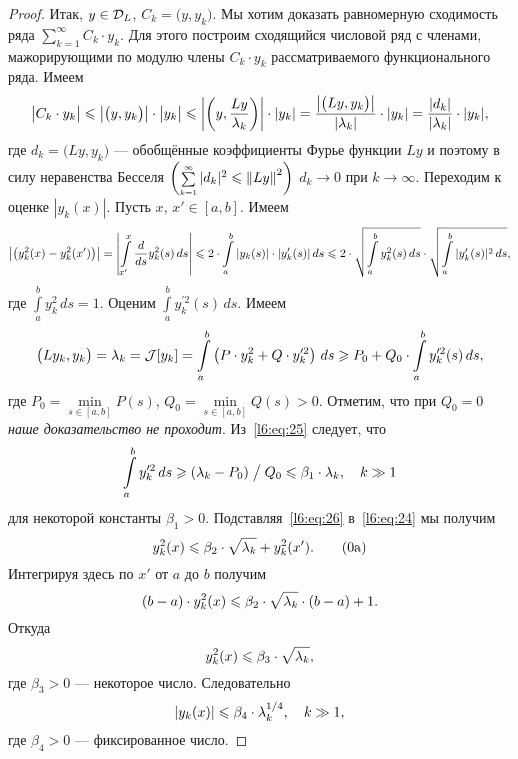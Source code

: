 \begin{proof}
	Итак, $y\in\mathcal{D}_L$, $C_k=\big(y,y_k\big)$. Мы хотим доказать равномерную сходимость ряда $\sum\limits_{k=1}^{\infty}C_k\cdot y_k$. Для этого построим сходящийся числовой ряд	с членами, мажорирующими по модулю члены $C_k\cdot y_k$ рассматриваемого функционального ряда. Имеем
	\begin{equation}
		\label{l6:eq:23}
		\hfill\big|C_k\cdot y_k\big|\leqslant\big|\big(y,y_k\big)\big|\cdot\big|y_k\big|\leqslant\left|\left(y,\frac{Ly}{\lambda_k}\right)\right|\cdot|y_k|=\frac{\big|\big(Ly,y_k\big)\big|}{|\lambda_k|}\cdot|y_k|=\frac{|d_k|}{|\lambda_k|}\cdot|y_k|,\hfill
	\end{equation}
	где $d_k=\big(Ly,y_k\big)$ --- обобщённые коэффициенты Фурье функции $Ly$ и поэтому в силу неравенства Бесселя $\left(\scriptstyle\sum\limits_{k=1}^{\infty}\textstyle|d_k|^2\leqslant{\ensuremath{\left\|Ly\right\|}}^2\right)$ $d_k\to0$ при $k\to \infty$. Переходим к оценке $|y_k(x)|$. Пусть $x,\,x'\in[a,b]$. Имеем
	\begin{equation}
		\label{l6:eq:24}
		\big|\big(y_k^2(x)-y_k^2(x')\big)\big|=\left|\int\limits_{x'}^{x}\frac{d}{ds}y_k^2(s)\,ds\right|\leqslant2\cdot\int\limits_a^b|y_k(s)|\cdot|y'_k(s)|\,ds\leqslant2\cdot\sqrt{\int\limits_a^b y_k^2(s)\,ds}\cdot\sqrt{\int\limits_a^b |y'_k(s)|^2\,ds},
	\end{equation} 
	где $\int\limits_a^b y_k^2\,ds=1$. Оценим $\int\limits_a^b y_k^{\prime2}(s)\,ds$. Имеем 
	\begin{equation}
		\label{l6:eq:25}
		\big(Ly_k,y_k\big)=\lambda_k=\mathcal{J}[y_k]=\int\limits_a^b\left(P\cdot y_k^2+Q\cdot y_k^{\prime2}\right)\,ds\geqslant P_0+Q_0\cdot\int\limits_a^b y_k^{\prime2}(s)\,ds,
	\end{equation}
	где $P_0=\min\limits_{s\in[a,b]}P(s)$, $Q_0=\min\limits_{s\in[a,b]}Q(s)>0$. Отметим, что при \emph{$Q_0=0$ наше доказательство не проходит}. Из~\eqref{l6:eq:25} следует, что 
	\begin{equation}
		\label{l6:eq:26}
		\hfill\int\limits_a^b y_k^{\prime2}\,ds\geqslant(\lambda_k-P_0)\bigm/Q_0\leqslant\beta_1\cdot\lambda_k,\quad k\gg1\hfill
	\end{equation}  
	для некоторой константы $\beta_1>0$. Подставляя~\eqref{l6:eq:26} в~\eqref{l6:eq:24} мы получим 
	\begin{equation}
		\label{l6:eq:26a}
		\hfill y_k^2(x)\leqslant\beta_2\cdot\sqrt{\lambda_k}+y_k^2(x').\tag{\theequation a}\hfill
	\end{equation}
	Интегрируя здесь по $x'$ от $a$ до $b$ получим 
	\begin{equation*}
		\hfill(b-a)\cdot y_k^2(x)\leqslant\beta_2\cdot\sqrt{\lambda_k}\cdot(b-a)+1.\hfill
	\end{equation*}
	Откуда 
	\begin{equation*}
		\hfill y_k^2(x)\leqslant\beta_3\cdot\sqrt{\lambda_k},\hfill
	\end{equation*}
	где $\beta_3>0$ --- некоторое число. Следовательно
	\begin{equation}
		\label{l6:eq:27}
		\hfill|y_k(x)|\leqslant\beta_4\cdot\lambda_k^{1/4},\quad k\gg1,\hfill
	\end{equation}
	где $\beta_4>0$ --- фиксированное число.
	

\end{proof}

